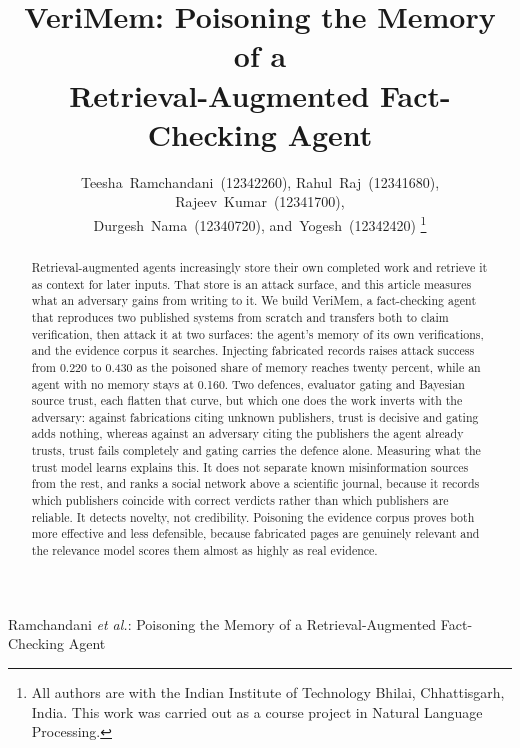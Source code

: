 \documentclass[journal]{IEEEtran}
\begin{document}
\title{VeriMem: Poisoning the Memory of a\\ Retrieval-Augmented Fact-Checking Agent}

\author{
  Teesha~Ramchandani~(12342260),
  Rahul~Raj~(12341680),
  Rajeev~Kumar~(12341700),\\
  Durgesh~Nama~(12340720),
  and~Yogesh~(12342420)%
  \thanks{All authors are with the Indian Institute of Technology Bhilai,
  Chhattisgarh, India. This work was carried out as a course project in
  Natural Language Processing.}%
}

%
{Ramchandani \MakeLowercase{\textit{et al.}}: Poisoning the Memory of a Retrieval-Augmented Fact-Checking Agent}

\maketitle

\begin{abstract}
Retrieval-augmented agents increasingly store their own completed work and
retrieve it as context for later inputs. That store is an attack surface, and
this article measures what an adversary gains from writing to it. We build
VeriMem, a fact-checking agent that reproduces two published systems from
scratch and transfers both to claim verification, then attack it at two
surfaces: the agent's memory of its own verifications, and the evidence corpus
it searches. Injecting fabricated records raises attack success from 0.220 to
0.430 as the poisoned share of memory reaches twenty percent, while an agent
with no memory stays at 0.160. Two defences, evaluator gating and Bayesian
source trust, each flatten that curve, but which one does the work inverts with
the adversary: against fabrications citing unknown publishers, trust is decisive
and gating adds nothing, whereas against an adversary citing the publishers the
agent already trusts, trust fails completely and gating carries the defence
alone. Measuring what the trust model learns explains this. It does not separate
known misinformation sources from the rest, and ranks a social network above a
scientific journal, because it records which publishers coincide with correct
verdicts rather than which publishers are reliable. It detects novelty, not
credibility. Poisoning the evidence corpus proves both more effective and less
defensible, because fabricated pages are genuinely relevant and the relevance
model scores them almost as highly as real evidence.
\end{abstract}
\end{document}

